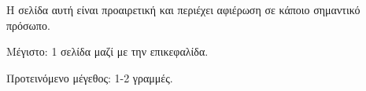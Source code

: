 \chapter*{\cseafierwsi}
\thispagestyle{empty}


Η σελίδα αυτή είναι προαιρετική και περιέχει αφιέρωση σε κάποιο
σημαντικό πρόσωπο.

\y\noindent Μέγιστο: 1 σελίδα μαζί με την επικεφαλίδα.

\y\noindent Προτεινόμενο μέγεθος: 1-2 γραμμές.
